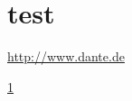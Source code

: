\documentclass{article}
\begin{document}
\section{test}\label{test}

\url{http://www.dante.de}

\ref{test}

\end{document}
